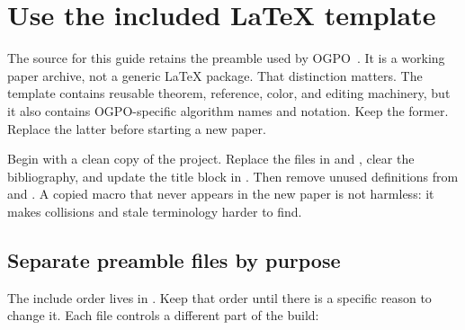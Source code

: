 \section{Use the included LaTeX template}
\label{sec:template}

The source for this guide retains the preamble used by
OGPO~\citep{patil2026ogpo}. It is a working paper archive, not a generic LaTeX
package. That distinction matters. The template contains reusable theorem,
reference, color, and editing machinery, but it also contains OGPO-specific
algorithm names and notation. Keep the former. Replace the latter before
starting a new paper.

Begin with a clean copy of the project. Replace the files in  and
, clear the bibliography, and update the title block in
. Then remove unused definitions from
 and . A copied macro that never
appears in the new paper is not harmless: it makes collisions and stale
terminology harder to find.

\subsection{Separate preamble files by purpose}

The include order lives in . Keep that
order until there is a specific reason to change it. Each file controls a
different part of the build:

